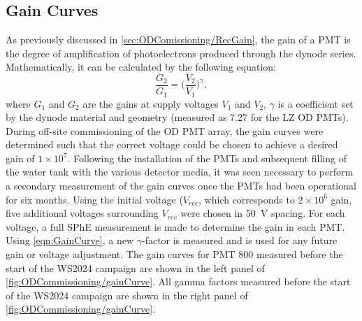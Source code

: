 \subsection{Gain Curves}
As previously discussed in \autoref{sec:ODComissioning/RecGain}, the gain of a PMT is the degree of amplification of photoelectrons produced through the dynode series. Mathematically, it can be calculated by the following equation:
\begin{equation}
    \label{eqn:GainCurve}
    \frac{G_2}{G_1}=\biggl(\frac{V_2}{V_1}\biggl)^\gamma,
\end{equation}
where $G_1$ and $G_2$ are the gains at supply voltages $V_1$ and $V_2$, $\gamma$ is a coefficient set by the dynode material and geometry (measured as 7.27 for the LZ OD PMTs). During off-site commissioning of the OD PMT array, the gain curves were determined such that the correct voltage could be chosen to achieve a desired gain of $1\times10^7$. Following the installation of the PMTs and subsequent filling of the water tank with the various detector media, it was seen necessary to perform a secondary measurement of the gain curves once the PMTs had been operational for six months.
Using the initial voltage ($V_{rec}$, which corresponds to $2\times10^6$ gain, five additional voltages surrounding $V_{rec}$ were chosen in 50~V spacing. For each voltage, a full SPhE measurement is made to determine the gain in each PMT. Using \autoref{eqn:GainCurve}, a new $\gamma$-factor is measured and is used for any future gain or voltage adjustment. The gain curves for PMT 800 measured before the start of the WS2024 campaign are shown in the left panel of \autoref{fig:ODCommissioning/gainCurve}. All gamma factors measured before the start of the WS2024 campaign are shown in the right panel of \autoref{fig:ODCommissioning/gainCurve}.
\iffalse
